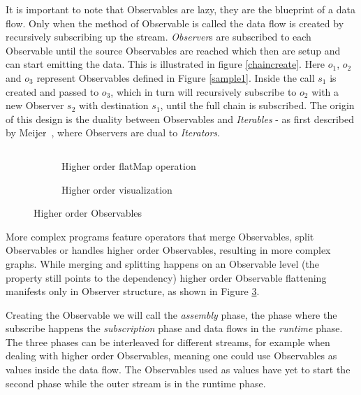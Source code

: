 It is important to note that Observables are lazy, they are the blueprint of a data flow. Only when the  method of Observable is called the data flow is created by recursively subscribing up the stream. \textit{Observer}s are subscribed to each Observable until the source Observables are reached which then are setup and can start emitting the data.
This is illustrated in figure \ref{chaincreate}. Here $o_1$, $o_2$ and $o_3$ represent Observables defined in Figure \ref{sample1}. Inside the  call $s_1$ is created and passed to $o_3$, which in turn will recursively subscribe to $o_2$ with a new Observer $s_2$ with destination $s_1$, until the full chain is subscribed.
The origin of this design is the duality between Observables and \textit{Iterables} - as first described by Meijer~\cite{meijer2010subject}, where Observers are dual to \textit{Iterators}.

\begin{figure}

\begin{subfigure}[a]{\columnwidth}
\inputminted[tabsize=2]{javascript}{listings/sample3.js}	
\caption{Higher order flatMap operation}
\label{sample3}
\end{subfigure}

\begin{subfigure}[b]{\columnwidth}
\centering

\caption{Higher order visualization}
\label{chainhigher}
\end{subfigure}

\caption{Higher order Observables}

\end{figure}

More complex programs feature operators that merge Observables, split Observables or handles higher order Observables, resulting in more complex graphs. While merging and splitting happens on an Observable level (the  property still points to the dependency) higher order Observable flattening manifests only in Observer structure, as shown in Figure \ref{chainhigher}.

Creating the Observable we will call the \textit{assembly} phase, the phase where the subscribe happens the \textit{subscription} phase and data flows in the \textit{runtime} phase. The three phases can be interleaved for different streams, for example when dealing with higher order Observables,  meaning one could use Observables as values inside the data flow. The Observables used as values have yet to start the second phase while the outer stream is in the runtime phase.
